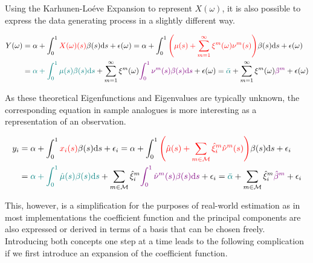 \documentclass[11pt,twoside,a4paper]{article}
\begin{document}
	Using the Karhunen-Lo\'{e}ve Expansion to represent $X(\omega)$, it is also possible to express the data generating process in a slightly different way.
	
	\begin{equation}
		\begin{split}
			Y(\omega) &= \alpha + \int_{0}^{1} {\color{red}X(\omega)(s)} \beta(s) \mathrm{d}s + \epsilon(\omega)
			= \alpha + \int_{0}^{1} {\color{red}\left(\mu(s) + \sum_{m = 1}^{\infty} \xi^m(\omega) \nu^m(s)\right)} \beta(s) \mathrm{d}s + \epsilon(\omega)\\
			&= {\color{teal}\alpha + \int_{0}^{1} \mu(s) \beta(s) \mathrm{d}s} + \sum_{m = 1}^{\infty} \xi^m(\omega) {\color{violet}\int_{0}^{1} \nu^m(s) \beta(s) \mathrm{d}s} + \epsilon(\omega)
			= {\color{teal}\bar{\alpha}} + \sum_{m = 1}^{\infty} \xi^m(\omega) {\color{violet}\beta^m} + \epsilon(\omega)
		\end{split}
	\end{equation}

	As these theoretical Eigenfunctions and Eigenvalues are typically unknown, the corresponding equation in sample analogues is more interesting as a representation of an observation.
	
	\begin{equation}
		\begin{split}
			y_i &= \alpha + \int_{0}^{1} {\color{red}x_i(s)} \beta(s) \mathrm{d}s + \epsilon_i
			= \alpha + \int_{0}^{1} {\color{red}\left(\hat{\mu}(s) + \sum_{m \in \mathcal{M}} \hat{\xi}^m_i \hat{\nu}^m(s)\right)} \beta(s) \mathrm{d}s + \epsilon_i\\
			&= {\color{teal}\alpha + \int_{0}^{1} \hat{\mu}(s) \beta(s) \mathrm{d}s} + \sum_{m \in \mathcal{M}} \hat{\xi}^m_i {\color{violet}\int_{0}^{1} \hat{\nu}^m(s) \beta(s) \mathrm{d}s} + \epsilon_i
			= {\color{teal}\bar{\alpha}} + \sum_{m \in \mathcal{M}} \hat{\xi}^m_i {\color{violet}\hat{\beta}^m} + \epsilon_i
		\end{split}
	\end{equation}
	
	This, however, is a simplification for the purposes of real-world estimation as in most implementations the coefficient function and the principal components are also expressed or derived in terms of a basis that can be chosen freely. Introducing both concepts one step at a time leads to the following complication if we first introduce an expansion of the coefficient function.
\end{document}
